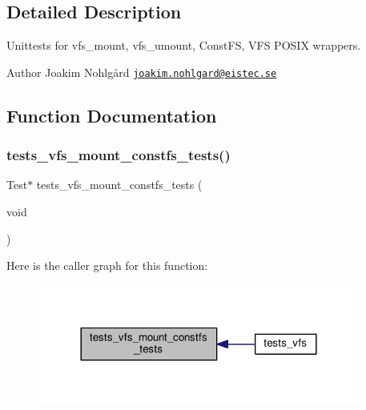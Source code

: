 \subsection{Detailed Description}
Unittests for vfs\+\_\+mount, vfs\+\_\+umount, Const\+FS, V\+FS P\+O\+S\+IX wrappers. 

\begin{DoxyAuthor}{Author}
Joakim Nohlgård \href{mailto:joakim.nohlgard@eistec.se}{\tt joakim.\+nohlgard@eistec.\+se} 
\end{DoxyAuthor}


\subsection{Function Documentation}
\mbox{\label{tests-vfs-mount-constfs_8c_a15914761731ece3546c1f4ae3b262c58}} 
\subsubsection{\texorpdfstring{tests\+\_\+vfs\+\_\+mount\+\_\+constfs\+\_\+tests()}{tests\_vfs\_mount\_constfs\_tests()}}
{\footnotesize\ttfamily Test$\ast$ tests\+\_\+vfs\+\_\+mount\+\_\+constfs\+\_\+tests (\begin{DoxyParamCaption}\item[{void}]{ }\end{DoxyParamCaption})}

Here is the caller graph for this function\+:
\nopagebreak
\begin{figure}[H]
\begin{center}
\leavevmode
\includegraphics[width=300pt]{tests-vfs-mount-constfs_8c_a15914761731ece3546c1f4ae3b262c58_icgraph}
\end{center}
\end{figure}
